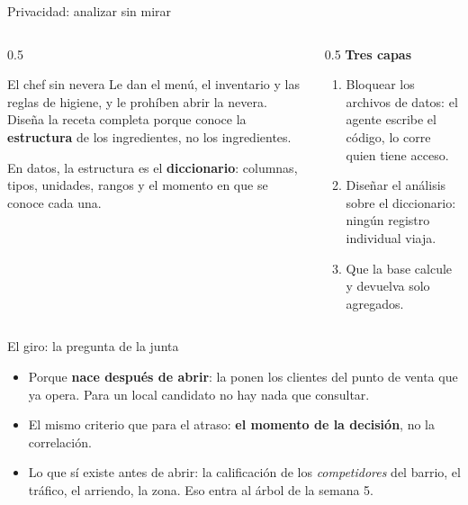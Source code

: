 \documentclass{beamer}
\begin{document}
\begin{frame}{Privacidad: analizar sin mirar}
\begin{columns}[T]
\begin{column}{0.5\textwidth}
\begin{block}{El chef sin nevera}
Le dan el menú, el inventario y las reglas de higiene, y le prohíben abrir la nevera. Diseña la receta completa porque conoce la \textbf{estructura} de los ingredientes, no los ingredientes.
\end{block}
\small En datos, la estructura es el \textbf{diccionario}: columnas, tipos, unidades, rangos y el momento en que se conoce cada una.
\end{column}
\begin{column}{0.5\textwidth}
\small
\textbf{Tres capas}
\begin{enumerate}\itemsep3pt
  \item Bloquear los archivos de datos: el agente escribe el código, lo corre quien tiene acceso.
  \item Diseñar el análisis sobre el diccionario: ningún registro individual viaja.
  \item Que la base calcule y devuelva solo agregados.
\end{enumerate}
\medskip
{}
\end{column}
\end{columns}
\end{frame}

\begin{frame}{El giro: la pregunta de la junta}
\medskip
\begin{itemize}\itemsep4pt
  \item Porque \textbf{nace después de abrir}: la ponen los clientes del punto de venta que ya opera. Para un local candidato no hay nada que consultar.
  \item El mismo criterio que para el atraso: \textbf{el momento de la decisión}, no la correlación.
  \item Lo que sí existe antes de abrir: la calificación de los \emph{competidores} del barrio, el tráfico, el arriendo, la zona. Eso entra al árbol de la semana 5.
\end{itemize}
\end{frame}
\end{document}
